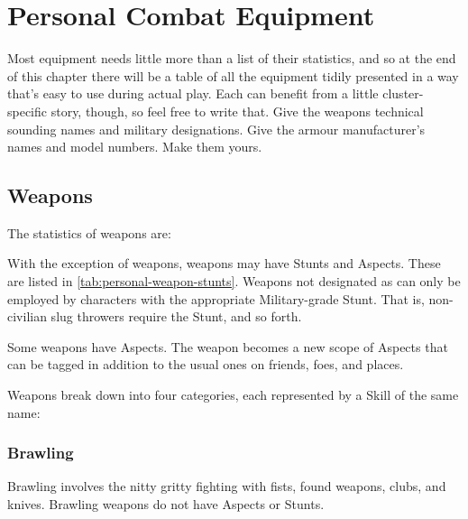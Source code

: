 \section{Personal Combat Equipment}
\label{sec:personal-combat-equipment}

Most equipment needs little more than a list of their statistics, and so at the end of this chapter there will be a table of all the equipment tidily presented in a way that's easy to use during actual play. Each can benefit from a little cluster-specific story, though, so feel free to write that. Give the weapons technical sounding names and military designations. Give the armour manufacturer's names and model numbers. Make them yours.



\subsection{Weapons}

The statistics of weapons are:



With the exception of  weapons, weapons may have Stunts and Aspects. These are listed in \autoref{tab:personal-weapon-stunts}. Weapons not designated as  can only be employed by characters with the appropriate Military-grade Stunt. That is, non-civilian slug throwers require the  Stunt, and so forth.

Some weapons have Aspects. The weapon becomes a new scope of Aspects that can be tagged in addition to the usual ones on friends, foes, and places.

Weapons break down into four categories, each represented by a Skill of the same name:

\subsubsection{Brawling}
\label{sec:brawling}

Brawling involves the nitty gritty fighting with fists, found weapons, clubs, and knives. Brawling weapons do not have Aspects or Stunts.

